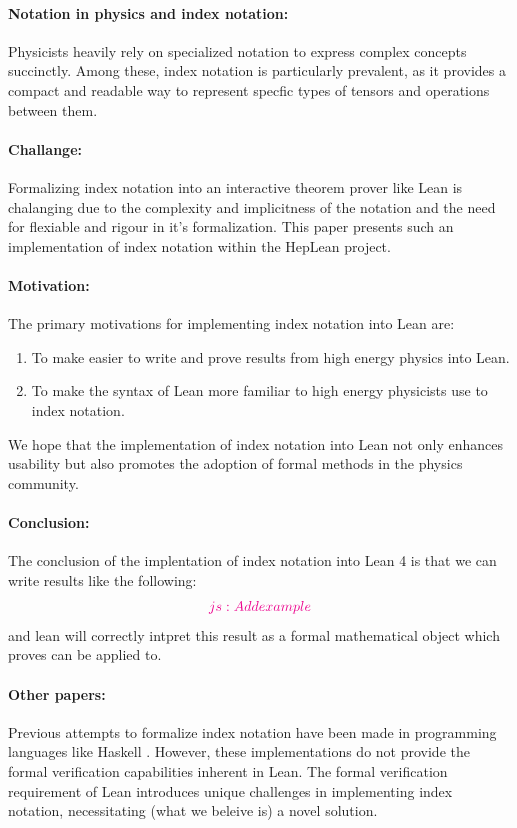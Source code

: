 \documentclass[a4paper, 11pt]{article}
\newcommand{\js}[1]{ {\color{magenta} js:  #1}}
\begin{document}
\paragraph{Notation in physics and index notation:}
Physicists heavily rely on specialized notation to express complex concepts succinctly. 
Among these, index notation is particularly prevalent,
 as it provides a compact and readable way to represent specfic types of tensors and operations
 between them.

\paragraph{Challange:} Formalizing index notation into an interactive theorem prover like Lean 
is chalanging due to the complexity and implicitness 
of the notation and the need for flexiable  and rigour in it's formalization. 
This paper presents such an implementation of index notation within the HepLean project.


\paragraph{Motivation:} The primary motivations for implementing index notation into Lean are:
\begin{enumerate}
  \item To make easier to write and prove results from high energy physics into Lean. 
  \item To make the syntax of Lean more familiar to high energy physicists use to index notation.
\end{enumerate}
We hope that the implementation  of index notation into Lean
not only enhances usability but also promotes the adoption of formal methods in the 
physics community.

\paragraph{Conclusion:} The conclusion of the implentation of index notation into Lean 4 is that 
we can write results like the following: 
\begin{equation}
\js{Add example}
\end{equation}
and lean will correctly intpret this result as a formal mathematical object which proves can be 
applied to.


\paragraph{Other papers:}
Previous attempts to formalize index notation have been made in programming languages like Haskell 
\cite{haskell-index-notation}. However, these implementations do not
 provide the formal verification capabilities inherent in Lean. 
 The formal verification requirement of Lean introduces unique challenges in implementing index 
 notation, necessitating (what we beleive is) a novel solution.
\end{document}
